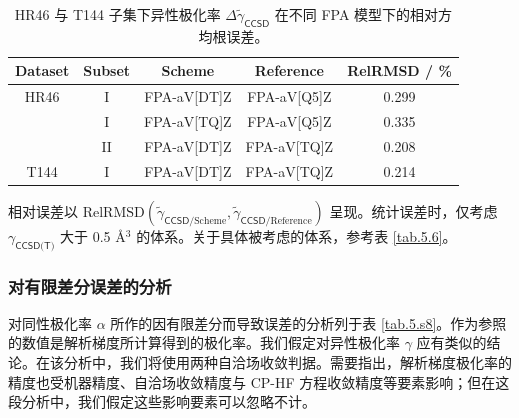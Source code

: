 \begin{table}[ht]
    \centering
    \caption{HR46 与 T144 子集下异性极化率 $\Delta \tilde \gamma_\textsf{CCSD}$ 在不同 FPA 模型下的相对方均根误差。}
    \label{tab.5.s6}
    \begin{tabular}{ccccc}
    \hline
    Dataset & Subset & Scheme & Reference & RelRMSD / \% \\ \hline
    HR46    &  I & FPA-aV[DT]Z & FPA-aV[Q5]Z & 0.299 \\
            &  I & FPA-aV[TQ]Z & FPA-aV[Q5]Z & 0.335 \\
            & II & FPA-aV[DT]Z & FPA-aV[TQ]Z & 0.208 \\
    T144    &  I & FPA-aV[DT]Z & FPA-aV[TQ]Z & 0.214 \\ \hline
    \end{tabular}

    \raggedright
    \par{} 相对误差以 $\text{RelRMSD} (\tilde \gamma_{\textsf{CCSD}/\text{Scheme}}, \tilde \gamma_{\textsf{CCSD}/\text{Reference}})$ 呈现。统计误差时，仅考虑 $\gamma_{\textsf{CCSD(T)}}$ 大于 0.5 $\text{\AA}{}^{3}$ 的体系。关于具体被考虑的体系，参考表 \ref{tab.5.6}。
\end{table}

\subsubsection{对有限差分误差的分析}
\label{sec.5.s9}

对同性极化率 $\alpha$ 所作的因有限差分而导致误差的分析列于表 \ref{tab.5.s8}。作为参照的数值是解析梯度所计算得到的极化率。我们假定对异性极化率 $\gamma$ 应有类似的结论。在该分析中，我们将使用两种自洽场收敛判据。需要指出，解析梯度极化率的精度也受机器精度、自洽场收敛精度与 CP-HF 方程收敛精度等要素影响；但在这段分析中，我们假定这些影响要素可以忽略不计。

